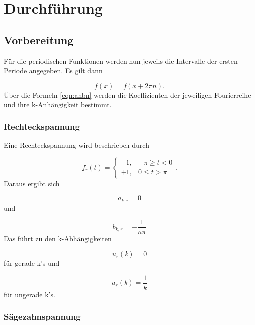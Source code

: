  \section{Durchführung}
\label{sec:Durchführung}

\subsection{Vorbereitung}
\label{sec:Vorbereitung}

Für die periodischen Funktionen werden nun jeweils die Intervalle der ersten
Periode angegeben. Es gilt dann

\begin{equation}
  f(x) = f(x+2\pi n).
\end{equation}
Über die Formeln \eqref{eqn:anbn} werden
die Koeffizienten der jeweiligen Fourierreihe und ihre k-Anhängigkeit bestimmt.

\subsubsection{Rechteckspannung}

Eine Rechteckspannung wird beschrieben durch

\begin{equation}
  f_r(t) =
  \begin{cases}
    -1, & -\pi \geq t < 0 \\
    +1, & 0 \leq t > \pi
  \end{cases}.
\end{equation}
Daraus ergibt sich

\begin{equation}
  a_{k,r} = 0
\end{equation}
und

\begin{equation}
  b_{k,r} = -\frac{1}{n\pi}
\end{equation}
Das führt zu den k-Abhängigkeiten

\begin{equation}
  u_r(k) = 0
\end{equation}
für gerade k's und

\begin{equation}
  u_r(k) = \frac{1}{k}
\end{equation}
für ungerade k's.

\subsubsection{Sägezahnspannung}

